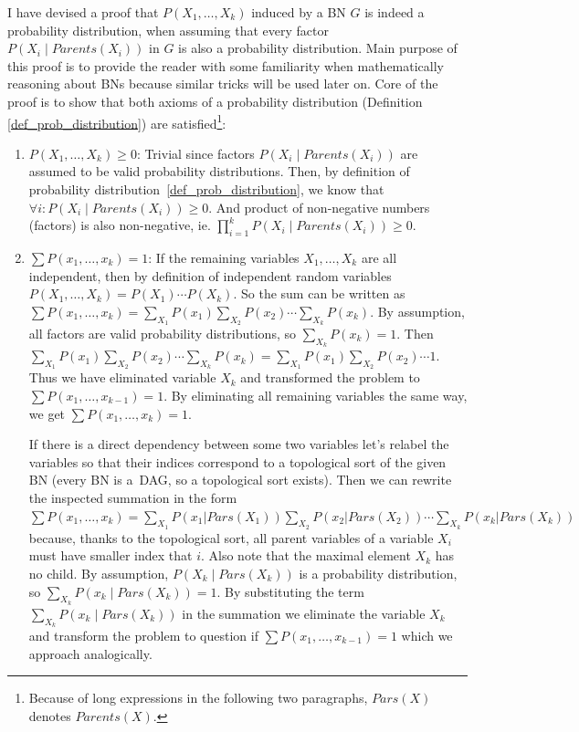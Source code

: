 \documentclass[english,cover]{fitthesis} %
\begin{document}
I have devised a proof that $P(X_1, \dots, X_k)$ induced by a BN $G$ is indeed a probability distribution, when assuming that every factor $P(X_i \mid Parents(X_i))$ in $G$ is also a probability distribution. Main purpose of this proof is to provide the reader with some familiarity when mathematically reasoning about BNs because similar tricks will be used later on. Core of the proof is to show that both axioms of a probability distribution (Definition \ref{def_prob_distribution}) are satisfied\footnote{Because of long expressions in the following two paragraphs, $Pars(X)$ denotes $Parents(X)$.}:
\begin{enumerate}
   \item $P(X_1, \dots, X_k) \geq 0$:
       Trivial since factors $P(X_i \mid Parents(X_i))$ are assumed to be valid probability distributions. Then, by definition of probability distribution~\ref{def_prob_distribution}, we know that $\forall i: P(X_i \mid Parents(X_i)) \geq 0$. And product of non-negative numbers (factors) is also non-negative, ie. $\prod_{i=1}^k P(X_i \mid Parents(X_i)) \geq 0$.
   \item $\sum P(x_1, \dots, x_k) = 1$:
       If the remaining variables $X_1, \dots, X_k$ are all independent, then by definition of independent random variables $P(X_1, \dots, X_k) = P(X_1) \dotsm P(X_k)$. So the sum can be written as $\sum P(x_1, \dots, x_k) = \sum_{X_1} P(x_1) \sum_{X_2} P(x_2) \dotsm \sum_{X_k} P(x_k)$. By assumption, all factors are valid probability distributions, so $\sum_{X_k} P(x_k) = 1$. Then $\sum_{X_1} P(x_1) \sum_{X_2} P(x_2) \dotsm \sum_{X_k} P(x_k) = \sum_{X_1} P(x_1) \sum_{X_2} P(x_2) \dotsm 1$. Thus we have eliminated variable $X_k$ and transformed the problem to $\sum P(x_1, \dots, x_{k-1}) = 1$. By eliminating all remaining variables the same way, we get $\sum P(x_1, \dots, x_k) = 1$.
       
       If there is a direct dependency between some two variables let's relabel the variables so that their indices correspond to a topological sort of the given BN (every BN is a~DAG, so a topological sort exists).  Then we can rewrite the inspected summation in the form $\sum P(x_1, \dots, x_k) = \sum_{X_1} P(x_1 | Pars(X_1)) \sum_{X_2} P(x_2 | Pars(X_2)) \dotsm \sum_{X_k} P(x_k | Pars(X_k))$ because, thanks to the topological sort, all parent variables of a variable $X_i$ must have smaller index that $i$. Also note that the maximal element $X_k$ has no child. By assumption, $P(X_k \mid Pars(X_k))$ is a probability distribution, so $\sum_{X_k} P(x_k \mid Pars(X_k)) = 1$. By substituting the term $\sum_{X_k} P(x_k \mid Pars(X_k))$ in the summation we eliminate the variable $X_k$ and transform the problem to question if $\sum P(x_1, \dots, x_{k-1}) = 1$ which we approach analogically.
\end{enumerate}
\end{document}
